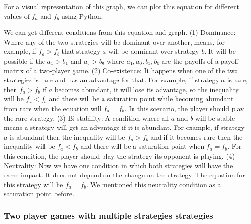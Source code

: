 \documentclass{article}
\begin{document}
For a visual representation of this graph, we can plot this equation for different values of $f_a$ and $f_b$ using Python.
\begin{figure}[h]
        \centering
        \label{fig:Visualization of $x_a(1-x_a)(f_a-f_b)=0$}
    \end{figure}
We can get different conditions from this equation and graph. 
(1) Dominance: Where any of the two strategies will be dominant over another, means, for example, if $f_a>f_b$ that strategy $a$ will be dominant over strategy $b$. It will be possible if the $a_1>b_1$ and $a_0>b_0$ where $a_1,a_0,b_1,b_0$ are the payoffs of a payoff matrix of a two-player game.
(2) Co-existence: It happens when one of the two strategies is rare and has an advantage for that. For example, if strategy $a$ is rare, then $f_a>f_b$ if $a$ becomes abundant, it will lose its advantage, so the inequality will be  $f_a<f_b$ and there will be a saturation point while becoming abundant from rare when the equation will $f_a=f_b$. In this scenario, the player should play the rare strategy.
(3) Bi-stability: A condition where all $a$ and $b$ will be stable means a strategy will get an advantage if it is abundant. For example, if strategy $a$ is abundant then the inequality will be $f_a>f_b$ and if it becomes rare then the inequality will be $f_a<f_b$ and there will be a saturation point when $f_a=f_b$. For this condition, the player should play the strategy its opponent is playing.
(4) Neutrality: Now we have one condition in which both strategies will have the same impact. It does not depend on the change on the strategy. The equation for this strategy will be $f_a=f_b$. We mentioned this neutrality condition as a saturation point before\cite{Gokhale2011}.



\subsubsection{Two player games with multiple strategies strategies}
\end{document}
